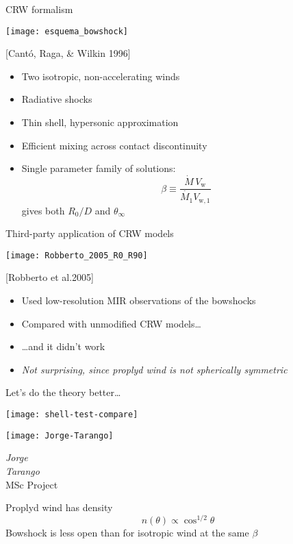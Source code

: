 \documentclass[presentation]{beamer}
\begin{document}
\begin{frame}{CRW formalism}
\begin{sidefig}{\texttt{[image: esquema\_bowshock]}}
  \begin{block}{[Cantó, Raga, \& Wilkin 1996]}
    \begin{itemize}
    \item Two isotropic, non-accelerating winds
    \item Radiative shocks
    \item Thin shell, hypersonic approximation
    \item Efficient mixing across contact discontinuity
    \item Single parameter family of solutions:
      \[
      \beta \equiv \frac{\dot{M}\, V_\mathrm{w}}{\dot{M_1} V_\mathrm{w,1}}
      \]
      gives both \(R_0/D\) and \(\theta_\infty\)
    \end{itemize}
  \end{block}
\end{sidefig}
\end{frame}

\begin{frame}{Third-party application of CRW models}
  \begin{sidefig}{
      \texttt{[image: Robberto\_2005\_R0\_R90]}}
    \begin{block}{[Robberto et al.\@ 2005]}
      \begin{itemize}
      \item Used low-resolution MIR observations of the bowshocks
      \item Compared with unmodified CRW models\dots
      \item \dots and it didn't work
      \item \emph{Not surprising, since proplyd wind is not spherically symmetric}
      \end{itemize}
    \end{block}
    
  \end{sidefig}
\end{frame}

\begin{frame}{Let's do the theory better\dots}
\begin{sidefig}{
  \texttt{[image: shell-test-compare]}
}
\parbox[c]{0.4\linewidth}{
  \texttt{[image: Jorge-Tarango]}
}%
\parbox[c]{0.6\linewidth}{\centering \textit{Jorge\\ Tarango}\\[\medskipamount] \footnotesize MSc Project}
\par
\bigskip
Proplyd wind has density 
\[n(\theta) \propto \cos^{1/2}\theta\]
Bowshock is less open than for isotropic wind at the same \(\beta\)
\end{sidefig}
\end{frame}
\end{document}
